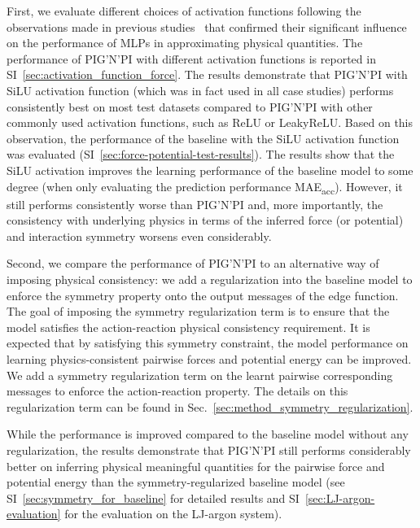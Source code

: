 \documentclass{article}
\newcommand{\pignpi}{PIG'N'PI\xspace}
\newcommand{\APPENDIX}{SI} %
\begin{document}
First, we evaluate different choices of activation functions following the observations made in previous studies~\cite{hu2021forcenet, niaki2021physics, klicpera2020directional} that confirmed their significant influence on the performance of MLPs in approximating physical quantities. The performance of \pignpi with different activation functions is  reported in \APPENDIX~\ref{sec:activation_function_force}. The results demonstrate that \pignpi with SiLU activation function (which was in fact used in all case studies) performs consistently best on most test datasets compared to \pignpi with other commonly used activation functions, such as ReLU or LeakyReLU. Based on this observation, the performance of the baseline with the SiLU activation function was evaluated (\APPENDIX~\ref{sec:force-potential-test-results}). The results show that the  SiLU activation improves the learning performance of the baseline model to some degree (when only evaluating the prediction performance \textsf{MAE\textsubscript{acc}}). However, it still performs consistently worse than \pignpi and, more importantly, the consistency with underlying physics in terms of the inferred force (or potential) and interaction symmetry worsens even considerably.


Second, we compare the performance of \pignpi to an  alternative way of imposing physical consistency: we add a regularization into the baseline model to enforce the symmetry property onto the output messages of the edge function. The goal of imposing the symmetry regularization term is to ensure that the model satisfies the action-reaction physical consistency requirement. It is expected that by satisfying this symmetry constraint, the model performance on learning physics-consistent pairwise forces and potential energy can be improved. We add a symmetry regularization term on the learnt pairwise corresponding messages to enforce the action-reaction property. The details on this regularization term can be found in Sec.~\ref{sec:method_symmetry_regularization}.


While the performance is improved compared to the baseline model without any regularization, the results demonstrate that \pignpi still performs considerably better on inferring  physical meaningful quantities for the pairwise force and potential energy than the symmetry-regularized baseline model  
(see \APPENDIX~\ref{sec:symmetry_for_baseline} for detailed results and \APPENDIX~\ref{sec:LJ-argon-evaluation} for the evaluation on the LJ-argon system).
\end{document}
